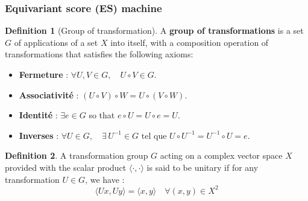 \documentclass[a4paper,10pt]{article}
\theoremstyle{definition} %
\newtheorem{definition}{Definition}[section]
\theoremstyle{definition} %
\theoremstyle{definition} %
\theoremstyle{definition} %
\newcommand{\R}{\mathbb{R}}
\newcommand{\0}{\boldsymbol{0}}
\begin{document}
\subsubsection{Equivariant score (ES) machine}
\begin{definition}[Group of transformation]
    A \textbf{group of transformations} is a set \( G \) of applications of a set \( X \) into itself, with a composition operation of transformations that satisfies the following axioms:
    \begin{itemize}[topsep=-5pt]
    \item[] \textbf{Fermeture} : \( \forall U, V \in G, \quad U \circ V \in G \).
    \item[] \textbf{Associativité} : \( (U \circ V) \circ W = U \circ (V \circ W) \).
    \item[] \textbf{Identité} : \( \exists e \in G \) so that \( e \circ U = U \circ e = U \).
    \item[] \textbf{Inverses} : \( \forall U \in G, \quad \exists \,U^{-1} \in G \text{ tel que } U \circ U^{-1} = U^{-1} \circ U = e \).
\end{itemize}
\end{definition}





\begin{definition}
    A transformation group $G$ acting on a complex vector space $X$ provided with the scalar product $\langle \cdot,\cdot \rangle$ is said to be unitary if for any transformation $U \in G$, we have :
    \begin{equation*}
        \langle Ux,Uy\rangle = \langle x,y\rangle \quad\forall(x,y) \in X^2
    \end{equation*}
\end{definition}
\end{document}
